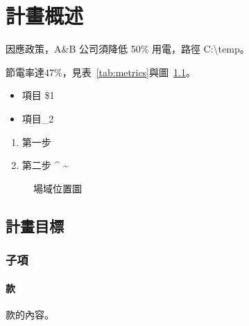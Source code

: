 
\chapter{計畫概述}


因應政策，A\&B 公司須降低 50\% 用電，路徑 C:\textbackslash{}temp。

節電率達47\%，見表~\ref{tab:metrics}與圖~\ref{fig:site-map}。

\begin{itemize}
  \item 項目 \$1
  \item 項目\_2
\end{itemize}

\begin{enumerate}
  \item 第一步
  \item 第二步 \textasciicircum{} \textasciitilde{}
\end{enumerate}

\begin{table}[htbp]
  \centering
  \caption{量測項目}
  \label{tab:metrics}
  
\end{table}

\begin{table}[htbp]
  \centering
  \caption{尚未填寫的表}
  \label{tab:empty}
  
\end{table}

\begin{figure}[htbp]
  \centering
  
  \caption{場域位置圖}
  \label{fig:site-map}
\end{figure}

\section{計畫目標}



\subsection{子項}

\subsubsection{款}

款的內容。
